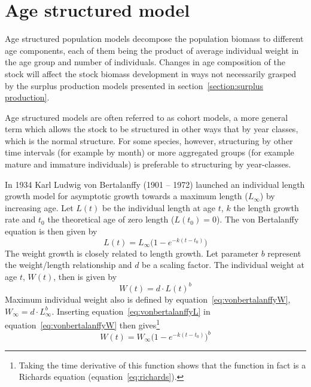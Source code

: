 \documentclass[11pt,fleqn]{book} %
\begin{document}

\section{Age structured model}\label{section:age structured model}

Age structured population models decompose the population biomass to different age components, each of them being the product of average individual weight in the age group and number of individuals. Changes in age composition of the stock will affect the stock biomass development in ways not necessarily grasped by the surplus production models presented in section~\ref{section:surplus production}.

Age structured models are often referred to as cohort models, a more general term which allows the stock to be structured in other ways that by year classes, which is the normal structure. For some species, however, structuring by other time intervals (for example by month) or more aggregated groups (for example mature and immature individuals) is preferable to structuring by year-classes.

In 1934 Karl Ludwig von Bertalanffy (1901 -- 1972) launched an individual length growth model for asymptotic growth towards a maximum length ($L_\infty$) by increasing age\cite{Bertalanffy1934}. Let $L(t)$ be the individual length at age $t$, $k$ the length growth rate and $t_0$ the theoretical age of zero length ($L(t_0) = 0$). The von Bertalanffy equation is then given by
\begin{equation} 
\label{eq:vonbertalanffyL}
L(t) = L_\infty \big(1 - e^{-k(t-t_0)}\big)
\end{equation}
The weight growth is closely related to length growth. Let parameter $b$ represent the weight/length relationship and $d$ be a scaling factor. The individual weight at age $t$, $W(t)$, then is given by
\begin{equation} 
\label{eq:vonbertalanffyW}
W(t) = d\cdot L(t)^b
\end{equation}
Maximum individual weight also is defined by equation~\ref{eq:vonbertalanffyW}, $W_\infty = d \cdot L_\infty^b$. Inserting equation~\ref{eq:vonbertalanffyL} in equation~\ref{eq:vonbertalanffyW} then gives\footnote{Taking the time derivative of this function shows that the function in fact is a Richards equation (equation~\ref{eq:richards}).}
\begin{equation} 
\label{eq:vonbertalanffy}
W(t) = W_\infty \big(1 - e^{-k(t-t_0)}\big)^b
\end{equation}
\end{document}
